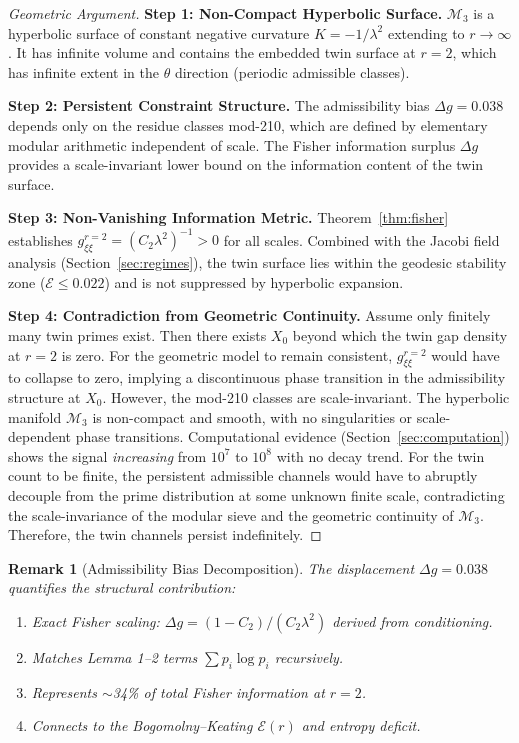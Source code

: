 \documentclass[12pt]{article}
\newtheorem{remark}[theorem]{Remark}
\begin{document}
\begin{proof}[Geometric Argument]
\textbf{Step 1: Non-Compact Hyperbolic Surface.}
$\mathcal{M}_3$ is a hyperbolic surface of constant negative curvature
$K = -1/\lambda^2$ extending to $r \to \infty$. It has infinite volume and
contains the embedded twin surface at $r=2$, which has infinite extent in the
$\theta$ direction (periodic admissible classes).

\textbf{Step 2: Persistent Constraint Structure.}
The admissibility bias $\Delta g = 0.038$ depends only on the residue classes
mod-210, which are defined by elementary modular arithmetic independent of scale.
The Fisher information surplus $\Delta g$ provides a scale-invariant lower bound
on the information content of the twin surface.

\textbf{Step 3: Non-Vanishing Information Metric.}
Theorem~\ref{thm:fisher} establishes $g_{\xi\xi}^{r=2} = (C_2\lambda^2)^{-1} > 0$
for all scales. Combined with the Jacobi field analysis (Section~\ref{sec:regimes}),
the twin surface lies within the geodesic stability zone ($\mathcal{E} \leq 0.022$)
and is not suppressed by hyperbolic expansion.

\textbf{Step 4: Contradiction from Geometric Continuity.}
Assume only finitely many twin primes exist. Then there exists $X_0$ beyond
which the twin gap density at $r=2$ is zero. For the geometric model to remain
consistent, $g_{\xi\xi}^{r=2}$ would have to collapse to zero, implying a
discontinuous phase transition in the admissibility structure at $X_0$. However,
the mod-210 classes are scale-invariant. The hyperbolic manifold $\mathcal{M}_3$
is non-compact and smooth, with no singularities or scale-dependent phase
transitions. Computational evidence (Section~\ref{sec:computation}) shows the
signal \textit{increasing} from $10^7$ to $10^8$ with no decay trend. For the
twin count to be finite, the persistent admissible channels would have to
abruptly decouple from the prime distribution at some unknown finite scale,
contradicting the scale-invariance of the modular sieve and the geometric
continuity of $\mathcal{M}_3$. Therefore, the twin channels persist indefinitely.
\end{proof}

\begin{remark}[Admissibility Bias Decomposition]
The displacement $\Delta g = 0.038$ quantifies the structural contribution:
\begin{enumerate}
  \item Exact Fisher scaling: $\Delta g = (1-C_2)/(C_2\lambda^2)$ derived from conditioning.
  \item Matches Lemma 1--2 terms $\sum p_i \log p_i$ recursively.
  \item Represents $\sim$34\% of total Fisher information at $r=2$.
  \item Connects to the Bogomolny--Keating $\mathcal{E}(r)$ and entropy deficit.
\end{enumerate}
\end{remark}
\end{document}
